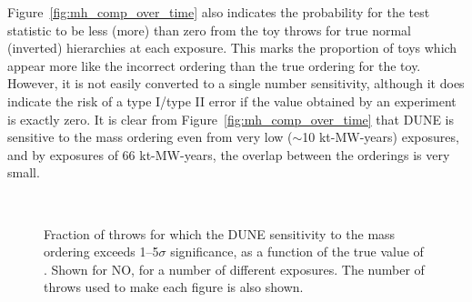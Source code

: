 Figure~\ref{fig:mh_comp_over_time} also indicates the probability for the test statistic \dchisq to be less (more) than zero from the toy throws for true normal (inverted) hierarchies at each exposure. This marks the proportion of toys which appear more like the incorrect ordering than the true ordering for the toy. However, it is not easily converted to a single number sensitivity, although it does indicate the risk of a type I/type II error if the \dchisq value obtained by an experiment is exactly zero. It is clear from Figure~\ref{fig:mh_comp_over_time} that DUNE is sensitive to the mass ordering even from very low ($\sim$10 kt-MW-years) exposures, and by exposures of 66 kt-MW-years, the overlap between the orderings is very small.

\begin{figure*}[htbp]
  \centering
  \\
  \caption{Fraction of throws for which the DUNE sensitivity to the mass ordering exceeds 1--5$\sigma$ significance, as a function of the true value of \deltacp. Shown for NO, for a number of different exposures. The number of throws used to make each figure is also shown.}
  \label{fig:mh_nh_over_time}
\end{figure*}

